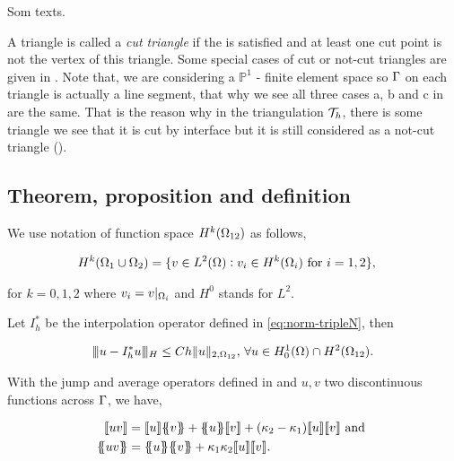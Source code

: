 \documentclass[../main.tex]{subfiles}
\begin{document}
Som texts.

\begin{remark}
  \label{rem:cut-triangle}
  A triangle is called a \textit{cut triangle} if the  is satisfied and at least one cut point is not the vertex of this triangle. Some special cases of cut or not-cut triangles are given in . Note that, we are considering a $\mathbb{P}^1$ - finite element space so $\Gamma$ on each triangle is actually a line segment, that why we see all three cases a, b and c in  are the same. That is the reason why in the triangulation $\mathcal{T}_h$, there is some triangle we see that it is cut by interface but it is still considered as a not-cut triangle ().
\end{remark}

\subsection{Theorem, proposition and definition}

\begin{definition}
  \label{def:HOmg12}
  We use notation of function space $H^k(\Omega_{12})$ as follows,

  \begin{align*}
    H^k(\Omega_1\cup\Omega_2) 
      &= \{ v\in L^2(\Omega): v_i\in H^k(\Omega_i) \text{ for } i =1,2 \},
  \end{align*}
  
  for $k=0,1,2$ where $v_i=v\vert_{\Omega_i}$ and $H^0$ stands for $L^2$.
\end{definition}

\begin{theorem}\label{theo:interpolant-hansbo}
  Let $I_h^{\ast}$ be the interpolation operator defined in \eqref{eq:norm-tripleN}, then

  \begin{align*}
    \rvert\hspace{-0.12em}\rvert\hspace{-0.12em}\rvert u - I_h^{\ast}u\rvert\hspace{-0.12em}\rvert\hspace{-0.12em}\rvert_H \le Ch\Vert{u}\Vert_{2,\Omega_{12}},
    \, \forall u \in H_0^1(\Omega) \cap H^2(\Omega_{12}).
  \end{align*}
\end{theorem}

\begin{proposition}\label{prop:jump-ave-prop}
  With the jump and average operators defined in  and $u,v$ two discontinuous functions across $\Gamma$, we have,

  \begin{align*}
    \ssb{uv} &= \ssb{u}\bbrace{v} 
                + \bbrace{u}\ssb{v}
                + (\kap_2 - \kap_1)\ssb{u} \ssb{v} \text{ and }  \\
    \bbrace{uv} &= \bbrace{u}\bbrace{v}
                  + \kap_1\kap_2 \ssb{u}\ssb{v}.
  \end{align*}
\end{proposition}
\end{document}
